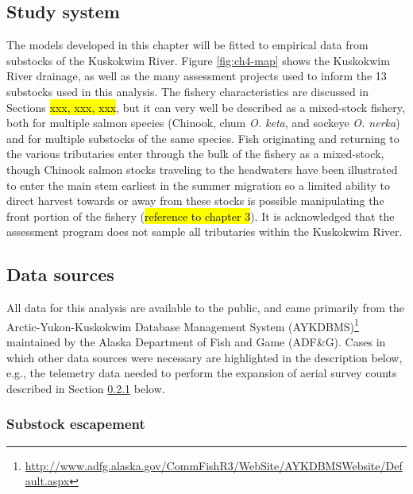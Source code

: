 \documentclass[12pt,]{book}
\let\rmarkdownfootnote\footnote%
\def\footnote{\protect\rmarkdownfootnote}
\theoremstyle{definition}
\theoremstyle{definition}
\theoremstyle{definition}
\theoremstyle{remark}
\begin{document}
\subsection{Study system}\label{study-system}

The models developed in this chapter will be fitted to empirical data
from substocks of the Kuskokwim River. Figure \ref{fig:ch4-map} shows
the Kuskokwim River drainage, as well as the many assessment projects
used to inform the 13 substocks used in this analysis. The fishery
characteristics are discussed in Sections \hl{xxx, xxx, xxx}, but it can
very well be described as a mixed-stock fishery, both for multiple
salmon species (Chinook, chum \emph{O. keta}, and sockeye \emph{O.
nerka}) and for multiple substocks of the same species. Fish originating
and returning to the various tributaries enter through the bulk of the
fishery as a mixed-stock, though Chinook salmon stocks traveling to the
headwaters have been illustrated to enter the main stem earliest in the
summer migration \citep{smith-liller-2017} so a limited ability to
direct harvest towards or away from these stocks is possible
manipulating the front portion of the fishery
(\hl{reference to chapter 3}). It is acknowledged that the assessment
program does not sample all tributaries within the Kuskokwim River.

\subsection{Data sources}\label{data-sources}

All data for this analysis are available to the public, and came
primarily from the Arctic-Yukon-Kuskokwim Database Management System
(AYKDBMS)\footnote{\url{http://www.adfg.alaska.gov/CommFishR3/WebSite/AYKDBMSWebsite/Default.aspx}}
maintained by the Alaska Department of Fish and Game (ADF\&G). Cases in
which other data sources were necessary are highlighted in the
description below, e.g., the telemetry data needed to perform the
expansion of aerial survey counts described in Section
\ref{air-expansion} below.

\subsubsection{Substock escapement}\label{air-expansion}
\end{document}
